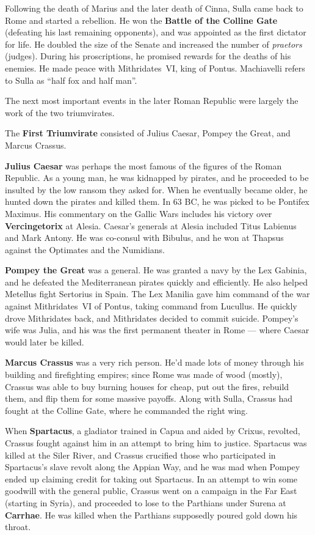 Following the death of Marius and the later death of Cinna,
Sulla came back to Rome and started a rebellion.
He won the \textbf{Battle of the Colline Gate} (defeating his last remaining opponents),
and was appointed as the first dictator for life.
He doubled the size of the Senate and increased the number of \textit{praetors} (judges).
During his proscriptions, he promised rewards for the deaths of his enemies.
He made peace with Mithridates~VI, king of Pontus.
Machiavelli refers to Sulla as ``half fox and half man''.

The next most important events in the later Roman Republic
were largely the work of the two triumvirates.

The \textbf{First Triumvirate} consisted of Julius Caesar, Pompey the Great, and Marcus Crassus.

\textbf{Julius Caesar} was perhaps the most famous of the figures of the Roman Republic.
As a young man, he was kidnapped by pirates,
and he proceeded to be insulted by the low ransom they asked for.
When he eventually became older, he hunted down the pirates and killed them.
In 63 BC, he was picked to be Pontifex Maximus.
His commentary on the Gallic Wars includes his victory over \textbf{Vercingetorix} at Alesia.
Caesar's generals at Alesia included Titus Labienus and Mark Antony.
He was co-consul with Bibulus, and he won at Thapsus against the Optimates and the Numidians.

\textbf{Pompey the Great} was a general.
He was granted a navy by the Lex Gabinia,
and he defeated the Mediterranean pirates quickly and efficiently.
He also helped Metellus fight Sertorius in Spain.
The Lex Manilia gave him command of the war against Mithridates~VI of Pontus,
taking command from Lucullus.
He quickly drove Mithridates back, and Mithridates decided to commit suicide.
Pompey's wife was Julia,
and his was the first permanent theater in Rome --- where Caesar would later be killed.

\textbf{Marcus Crassus} was a very rich person.
He'd made lots of money through his building and firefighting empires;
since Rome was made of wood (mostly), Crassus was able to buy burning houses for cheap,
put out the fires, rebuild them, and flip them for some massive payoffs.
Along with Sulla, Crassus had fought at the Colline Gate, where he commanded the right wing.

When \textbf{Spartacus}, a gladiator trained in Capua and aided by Crixus, revolted,
Crassus fought against him in an attempt to bring him to justice.
Spartacus was killed at the Siler River, and
Crassus crucified those who participated in Spartacus's slave revolt along the Appian Way,
and he was mad when Pompey ended up claiming credit for taking out Spartacus.
In an attempt to win some goodwill with the general public,
Crassus went on a campaign in the Far East (starting in Syria),
and proceeded to lose to the Parthians under Surena at \textbf{Carrhae}.
He was killed when the Parthians supposedly poured gold down his throat.


